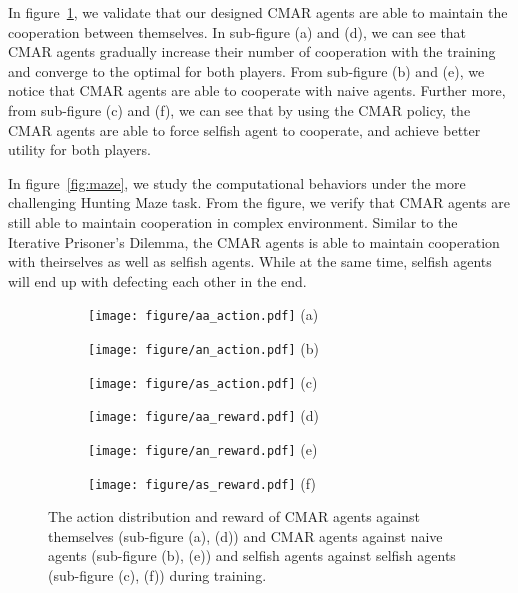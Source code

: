 \documentclass{article}
\begin{document}
In figure~\ref{fig:cmar},
we validate that our designed CMAR agents are able to maintain the cooperation between themselves.
In sub-figure (a) and (d),
we can see that CMAR agents gradually increase their number of cooperation with the training
and converge to the optimal for both players.
From sub-figure (b) and (e), we notice that CMAR agents are able to cooperate with naive agents.
Further more, from sub-figure (c) and (f), we can see that by using the CMAR policy,
the CMAR agents are able to force selfish agent to cooperate,
and achieve better utility for both players.

In figure~\ref{fig:maze},
we study the computational behaviors under the more challenging Hunting Maze task.
From the figure,
we verify that CMAR agents are still able to maintain cooperation in complex environment.
Similar to the Iterative Prisoner's Dilemma,
the CMAR agents is able to maintain cooperation with theirselves as well as selfish agents.
While at the same time, selfish agents will end up with defecting each other in the end.
\begin{figure}
\begin{subfigure}{.33\textwidth}
\centering
\texttt{[image: figure/aa\_action.pdf]}
(a)
\end{subfigure}
\begin{subfigure}{.33\textwidth}
\centering
\texttt{[image: figure/an\_action.pdf]}
(b)
\end{subfigure}
\begin{subfigure}{.33\textwidth}
\centering
\texttt{[image: figure/as\_action.pdf]}
(c)
\end{subfigure}

\begin{subfigure}{.33\textwidth}
\centering
\texttt{[image: figure/aa\_reward.pdf]}
(d)
\end{subfigure}
\begin{subfigure}{.33\textwidth}
\centering
\texttt{[image: figure/an\_reward.pdf]}
(e)
\end{subfigure}
\begin{subfigure}{.33\textwidth}
\centering
\texttt{[image: figure/as\_reward.pdf]}
(f)
\end{subfigure}
    \caption{The action distribution and reward of CMAR agents against themselves (sub-figure (a), (d)) and CMAR agents against naive agents (sub-figure (b), (e)) and selfish agents against selfish agents (sub-figure (c), (f)) during training.}
\label{fig:cmar}
\end{figure}
\end{document}
